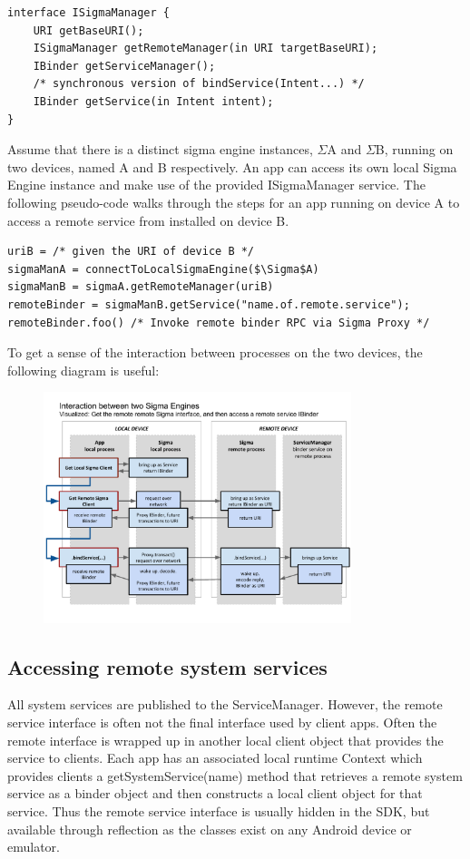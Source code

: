 \documentclass[prodmode]{acmlarge}
\begin{document}
\begin{Verbatim}[samepage=true]
interface ISigmaManager {
    URI getBaseURI();
    ISigmaManager getRemoteManager(in URI targetBaseURI);
    IBinder getServiceManager();
    /* synchronous version of bindService(Intent...) */
    IBinder getService(in Intent intent);
}
\end{Verbatim}

Assume that there is a distinct sigma engine instances, $\Sigma$A and $\Sigma$B, running on two devices, named A and B respectively. An app can access its own local Sigma Engine instance and make use of the provided ISigmaManager service. The following pseudo-code walks through the steps for an app running on device A to access a remote service from installed on device B.

\begin{Verbatim}[samepage=true]
uriB = /* given the URI of device B */
sigmaManA = connectToLocalSigmaEngine($\Sigma$A)
sigmaManB = sigmaA.getRemoteManager(uriB)
remoteBinder = sigmaManB.getService("name.of.remote.service");
remoteBinder.foo() /* Invoke remote binder RPC via Sigma Proxy */
\end{Verbatim}

To get a sense of the interaction between processes on the two devices, the following diagram is useful:
\begin{figure}[h]
\centering
\includegraphics[width=0.8\textwidth]{drawings/SigmaEngineInteraction.pdf}
\end{figure}

\subsection{Accessing remote system services}
All system services are published to the ServiceManager. However, the remote service interface is often not the final interface used by client apps. Often the remote interface is wrapped up in another local client object that provides the service to clients. Each app has an associated local runtime Context which provides clients a getSystemService(name) method that retrieves a remote system service as a binder object and then constructs a local client object for that service. Thus the remote service interface is usually hidden in the SDK, but available through reflection as the classes exist on any Android device or emulator.
\end{document}
